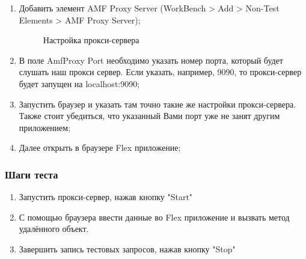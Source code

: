 \begin{enumerate}
\item Добавить элемент AMF Proxy Server (WorkBench > Add > Non-Test Elements > AMF Proxy Server);

\begin{figure}[ht]
\caption{Настройка прокси-сервера}
\label{ris:proxySettings.png}
\end{figure}

\item В поле AmfProxy Port необходимо указать номер порта, который будет слушать наш прокси сервер.
Если указать, например, 9090, то прокси-сервер будет запущен на localhost:9090;
\item Запустить браузер и указать там точно такие же настройки прокси-сервера.
Также стоит убедиться, что указанный Вами порт уже не занят другим приложением;
\item Далее открыть в браузере Flex приложение;
\end{enumerate}

\subsubsection{Шаги теста}

\begin{enumerate}
\item Запустить прокси-сервер, нажав кнопку "Start"
\item С помощью браузера ввести данные во Flex приложение и вызвать метод удалённого объект.
\item Завершить запись тестовых запросов, нажав кнопку "Stop"
\end{enumerate}

